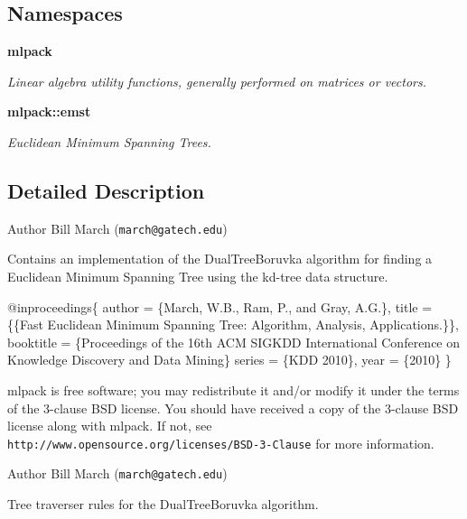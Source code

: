 \subsection*{Namespaces}
\begin{DoxyCompactItemize}
\item 
 {\bf mlpack}
\begin{DoxyCompactList}\small\item\em Linear algebra utility functions, generally performed on matrices or vectors. \end{DoxyCompactList}\item 
 {\bf mlpack\+::emst}
\begin{DoxyCompactList}\small\item\em Euclidean Minimum Spanning Trees. \end{DoxyCompactList}\end{DoxyCompactItemize}


\subsection{Detailed Description}
\begin{DoxyAuthor}{Author}
Bill March ({\tt march@gatech.\+edu})
\end{DoxyAuthor}
Contains an implementation of the Dual\+Tree\+Boruvka algorithm for finding a Euclidean Minimum Spanning Tree using the kd-\/tree data structure.


\begin{DoxyCode}
@inproceedings\{
  author = \{March, W.B., Ram, P., and Gray, A.G.\},
  title = \{\{Fast Euclidean Minimum Spanning Tree: Algorithm, Analysis,
     Applications.\}\},
  booktitle = \{Proceedings of the 16th ACM SIGKDD International Conference
     on Knowledge Discovery and Data Mining\}
  series = \{KDD 2010\},
  year = \{2010\}
\}
\end{DoxyCode}


mlpack is free software; you may redistribute it and/or modify it under the terms of the 3-\/clause B\+SD license. You should have received a copy of the 3-\/clause B\+SD license along with mlpack. If not, see {\tt http\+://www.\+opensource.\+org/licenses/\+B\+S\+D-\/3-\/\+Clause} for more information.

\begin{DoxyAuthor}{Author}
Bill March ({\tt march@gatech.\+edu})
\end{DoxyAuthor}
Tree traverser rules for the Dual\+Tree\+Boruvka algorithm.

